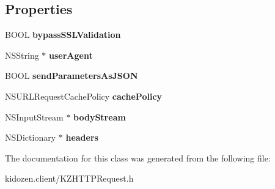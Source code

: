 \subsection*{Properties}
\begin{DoxyCompactItemize}
\item 
\hypertarget{interface_k_z_h_t_t_p_request_ae330eeae4f126616624622b91803c2d5}{B\-O\-O\-L {\bfseries bypass\-S\-S\-L\-Validation}}\label{interface_k_z_h_t_t_p_request_ae330eeae4f126616624622b91803c2d5}

\item 
\hypertarget{interface_k_z_h_t_t_p_request_a6916938f5e6c94934ac4fb3822a98913}{N\-S\-String $\ast$ {\bfseries user\-Agent}}\label{interface_k_z_h_t_t_p_request_a6916938f5e6c94934ac4fb3822a98913}

\item 
\hypertarget{interface_k_z_h_t_t_p_request_ad6fa8aa11002e44aff6cff5bb34c06dd}{B\-O\-O\-L {\bfseries send\-Parameters\-As\-J\-S\-O\-N}}\label{interface_k_z_h_t_t_p_request_ad6fa8aa11002e44aff6cff5bb34c06dd}

\item 
\hypertarget{interface_k_z_h_t_t_p_request_a2ad7f0aa71b1559614968478017cb4be}{N\-S\-U\-R\-L\-Request\-Cache\-Policy {\bfseries cache\-Policy}}\label{interface_k_z_h_t_t_p_request_a2ad7f0aa71b1559614968478017cb4be}

\item 
\hypertarget{interface_k_z_h_t_t_p_request_a6ae6d3f4eee276dd3b33f65ad5628cdb}{N\-S\-Input\-Stream $\ast$ {\bfseries body\-Stream}}\label{interface_k_z_h_t_t_p_request_a6ae6d3f4eee276dd3b33f65ad5628cdb}

\item 
\hypertarget{interface_k_z_h_t_t_p_request_a866cb74c28230adb5b2d90e3253fd186}{N\-S\-Dictionary $\ast$ {\bfseries headers}}\label{interface_k_z_h_t_t_p_request_a866cb74c28230adb5b2d90e3253fd186}

\end{DoxyCompactItemize}


The documentation for this class was generated from the following file\-:\begin{DoxyCompactItemize}
\item 
kidozen.\-client/K\-Z\-H\-T\-T\-P\-Request.\-h\end{DoxyCompactItemize}
